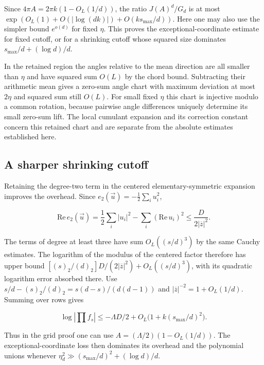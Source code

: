 Since $4\pi A=2\pi k(1-O_L(1/d))$, the ratio $J(A)^d/G_d$ is at most $\exp(O_L(1)+O(|\log(dk)|)+O(k s_{\max}/d))$. Here one may also use the simpler bound $e^{o(d)}$ for fixed $\eta$. This proves the exceptional-coordinate estimate for fixed cutoff, or for a shrinking cutoff whose squared size dominates $s_{\max}/d+(\log d)/d$.

In the retained region the angles relative to the mean direction are all smaller than $\eta$ and have squared sum $O(L)$ by the chord bound. Subtracting their arithmetic mean gives a zero-sum angle chart with maximum deviation at most $2\eta$ and squared sum still $O(L)$. For small fixed $\eta$ this chart is injective modulo a common rotation, because pairwise angle differences uniquely determine its small zero-sum lift. The local cumulant expansion and its correction constant concern this retained chart and are separate from the absolute estimates established here.


\subsection{A sharper shrinking cutoff}

Retaining the degree-two term in the centered elementary-symmetric expansion improves the overhead. Since $e_2(\vec u)=-\frac12\sum_i u_i^2$,

\begin{equation*}
\mathrm{Re}\,e_2(\vec u)
=\frac12\sum_i |u_i|^2-\sum_i(\mathrm{Re}\,u_i)^2
\le \frac{D}{2|\overline z|^2}.
\end{equation*}

The terms of degree at least three have sum $O_L((s/d)^3)$ by the same Cauchy estimates. The logarithm of the modulus of the centered factor therefore has upper bound
$[(s)_2/(d)_2]D/(2|\overline z|^2)+O_L((s/d)^3)$, with its quadratic logarithm error absorbed there. Use
$s/d-(s)_2/(d)_2=s(d-s)/(d(d-1))$ and $|\overline z|^{-2}=1+O_L(1/d)$. Summing over rows gives

\begin{equation*}
\log\left|\prod f_s\right|
\le-\Lambda D/2 + O_L\bigl(1+k(s_{\max}/d)^2\bigr).
\end{equation*}

Thus in the grid proof one can use $A=(\Lambda/2)(1-O_L(1/d))$. The exceptional-coordinate loss then dominates its overhead and the polynomial unions whenever $\eta_d^2\gg (s_{\max}/d)^2+(\log d)/d$.
